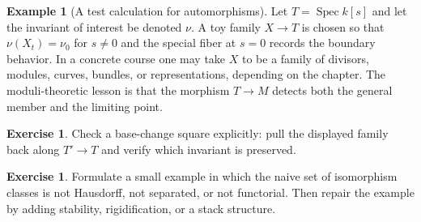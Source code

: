 \documentclass[11pt]{amsart}
\theoremstyle{definition}
\newtheorem{example}[theorem]{Example}
\newtheorem{exercise}[theorem]{Exercise}
\newcommand{\Spec}{\operatorname{Spec}}
\begin{document}
\begin{example}[A test calculation for automorphisms]
Let $T=\Spec k[s]$ and let the invariant of interest be denoted $\nu$.  A toy family $X\to T$ is chosen so that $\nu(X_t)=\nu_0$ for $s\ne0$ and the special fiber at $s=0$ records the boundary behavior.  In a concrete course one may take $X$ to be a family of divisors, modules, curves, bundles, or representations, depending on the chapter.  The moduli-theoretic lesson is that the morphism $T\to M$ detects both the general member and the limiting point.
\end{example}
\begin{exercise}
Check a base-change square explicitly: pull the displayed family back along $T\prime\to T$ and verify which invariant is preserved.
\end{exercise}
\begin{exercise}
Formulate a small example in which the naive set of isomorphism classes is not Hausdorff, not separated, or not functorial.  Then repair the example by adding stability, rigidification, or a stack structure.
\end{exercise}
\clearpage
\end{document}
